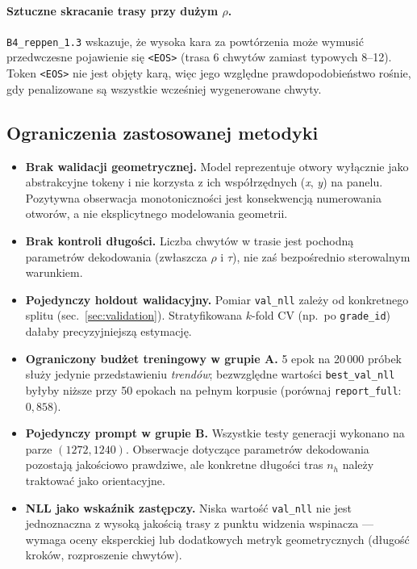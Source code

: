\documentclass[12pt,a4paper]{article}
\begin{document}
\paragraph{Sztuczne skracanie trasy przy dużym $\rho$.}
\texttt{B4\_reppen\_1.3} wskazuje, że wysoka kara za powtórzenia może wymusić przedwczesne pojawienie się \texttt{<EOS>} (trasa 6 chwytów zamiast typowych 8--12). Token \texttt{<EOS>} nie jest objęty karą, więc jego względne prawdopodobieństwo rośnie, gdy penalizowane są wszystkie wcześniej wygenerowane chwyty.

\subsection{Ograniczenia zastosowanej metodyki}

\begin{itemize}[leftmargin=1.5em]
    \item \textbf{Brak walidacji geometrycznej.} Model reprezentuje otwory wyłącznie jako abstrakcyjne tokeny i nie korzysta z ich współrzędnych (\textit{x}, \textit{y}) na panelu. Pozytywna obserwacja monotoniczności jest konsekwencją numerowania otworów, a nie eksplicytnego modelowania geometrii.
    \item \textbf{Brak kontroli długości.} Liczba chwytów w trasie jest pochodną parametrów dekodowania (zwłaszcza $\rho$ i $\tau$), nie zaś bezpośrednio sterowalnym warunkiem.
    \item \textbf{Pojedynczy holdout walidacyjny.} Pomiar \texttt{val\_nll} zależy od konkretnego splitu (sec.~\ref{sec:validation}). Stratyfikowana $k$-fold CV (np.\ po \texttt{grade\_id}) dałaby precyzyjniejszą estymację.
    \item \textbf{Ograniczony budżet treningowy w grupie A.} 5 epok na 20\,000 próbek służy jedynie przedstawieniu \emph{trendów}; bezwzględne wartości \texttt{best\_val\_nll} byłyby niższe przy 50 epokach na pełnym korpusie (porównaj \texttt{report\_full}: $0{,}858$).
    \item \textbf{Pojedynczy prompt w grupie B.} Wszystkie testy generacji wykonano na parze $(1272, 1240)$. Obserwacje dotyczące parametrów dekodowania pozostają jakościowo prawdziwe, ale konkretne długości tras $n_h$ należy traktować jako orientacyjne.
    \item \textbf{NLL jako wskaźnik zastępczy.} Niska wartość \texttt{val\_nll} nie jest jednoznaczna z wysoką jakością trasy z punktu widzenia wspinacza --- wymaga oceny eksperckiej lub dodatkowych metryk geometrycznych (długość kroków, rozproszenie chwytów).
\end{itemize}
\end{document}
